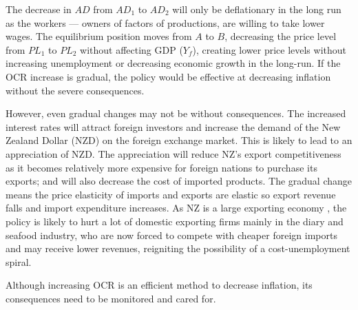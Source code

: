 \documentclass[a4paper,12pt]{article}
\begin{document}
The decrease in $AD$ from $AD_1$ to $AD_2$ will only be deflationary in the long run as the workers --- owners of factors of productions, are willing to take lower wages. The equilibrium position moves from $A$ to $B$, decreasing the price level from $PL_1$ to $PL_2$ without affecting GDP ($Y_f$), creating lower price levels without increasing unemployment or decreasing economic growth in the long-run. If the OCR increase is gradual, the policy would be effective at decreasing inflation without the severe consequences.

However, even gradual changes may not be without consequences. The increased interest rates will attract foreign investors and increase the demand of the New Zealand Dollar (NZD) on the foreign exchange market. This is likely to lead to an appreciation of NZD. The appreciation will reduce NZ's export competitiveness as it becomes relatively more expensive for foreign nations to purchase its exports; and will also decrease the cost of imported products. The gradual change means the price elasticity of imports and exports are elastic so export revenue falls and import expenditure increases. As NZ is a large exporting economy \parencite{exports}, the policy is likely to hurt a lot of domestic exporting firms mainly in the diary and seafood industry, who are now forced to compete with cheaper foreign imports and may receive lower revenues, reigniting the possibility of a cost-unemployment spiral.

Although increasing OCR is an efficient method to decrease inflation, its consequences need to be monitored and cared for.




\newpage
\printbibliography
\end{document}
